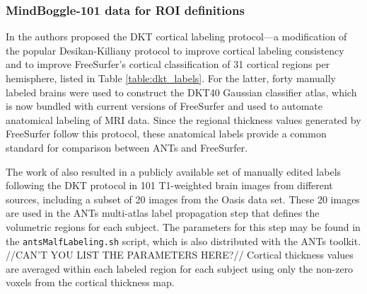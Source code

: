 \subsubsection{MindBoggle-101 data for ROI definitions}

In \cite{klein2012} the authors proposed the DKT cortical labeling protocol---a modification of the
popular Desikan-Killiany protocol \cite{desikan2006} to improve cortical labeling
consistency and to improve FreeSurfer's cortical classification of 31 cortical regions per hemisphere,
listed in Table \ref{table:dkt_labels}.
For the latter, forty manually labeled brains were used to construct the DKT40 Gaussian classifier atlas,
which is now bundled with current versions of FreeSurfer and
used to automate anatomical labeling of MRI data.
Since the regional thickness values generated by FreeSurfer follow this protocol,
these anatomical labels provide a common standard for comparison between ANTs and FreeSurfer.

The work of \cite{klein2012} also resulted in a publicly available set of
manually edited labels following the DKT protocol in 101
T1-weighted  brain images from different sources, including a subset of 20 images
from the Oasis data set.  These 20 images are used in the ANTs
multi-atlas label propagation \cite{wang2013} step that defines the volumetric regions for each subject.
The parameters for this step may be found in the {\tt antsMalfLabeling.sh} script, which is also
distributed with the ANTs toolkit.  //CAN'T YOU LIST THE PARAMETERS HERE?//
Cortical thickness values are averaged within each labeled region for each subject using only
the non-zero voxels from the cortical thickness map. 

